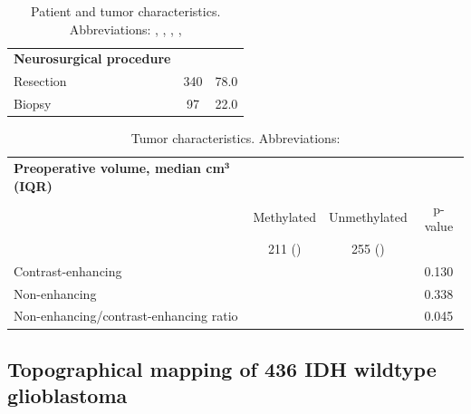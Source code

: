 \begin{table}
\begin{tabular}{L{5cm} S[table-number-alignment=center-decimal-marker, table-format=4.0] S[table-number-alignment=center-decimal-marker, table-format=4.1]}
    \textbf{Neurosurgical procedure}\\
    \hspace{1em}Resection & 340 & 78.0\\
    \hspace{1em}Biopsy & 97 & 22.0\\

    \bottomrule
\end{tabular}
\caption{Patient and tumor characteristics. Abbreviations: , , , , }\label{tab:HGG_location_characteristics}
\end{table}

\begin{table}
\begin{tabular}{L{5cm} S[table-number-alignment=center-decimal-marker, table-format=2.1] S[table-number-alignment=center-decimal-marker, table-format=2.1] S[table-number-alignment=center-decimal-marker, table-format=0.3]}
    \toprule
    {\textbf{Preoperative volume, median cm$^\textbf{3}$ (IQR)}}& \\
     & {Methylated} & {Unmethylated} & {p-value}\\
     & {211 ()} & {255 ()}\\
    \midrule
    Contrast-enhancing &  &  & 0.130\\
    Non-enhancing &  &  & 0.338\\
    Non-enhancing/contrast-enhancing ratio &  &  & 0.045\\
    \bottomrule
\end{tabular}
\caption{Tumor characteristics. Abbreviations: }\label{tab:HGG_location_tumor_characteristics}
\end{table}

\subsection{Topographical mapping of 436 \acrshort{IDH} wildtype glioblastoma}

